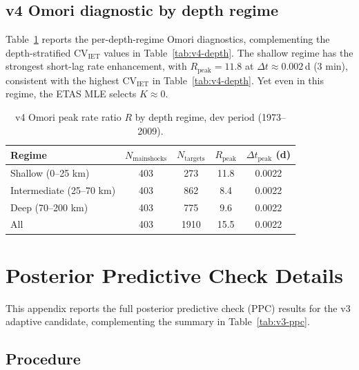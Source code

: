 \documentclass[10pt,a4paper,twocolumn]{article}
\begin{document}
\subsection{v4 Omori diagnostic by depth regime}

Table~\ref{tab:v4-omori-depth} reports the per-depth-regime Omori diagnostics, complementing the depth-stratified CV$_{\text{IET}}$ values in Table~\ref{tab:v4-depth}. The shallow regime has the strongest short-lag rate enhancement, with $R_{\text{peak}} = 11.8$ at $\Delta t \approx 0.002$\,d (3 min), consistent with the highest CV$_{\text{IET}}$ in Table~\ref{tab:v4-depth}. Yet even in this regime, the ETAS MLE selects $K\approx0$.

\begin{table}[t]
\centering
\caption{v4 Omori peak rate ratio $R$ by depth regime, dev period (1973--2009).}\label{tab:v4-omori-depth}
\small
\begin{tabular*}{\columnwidth}{@{\extracolsep{\fill}}lcccc}
\toprule
Regime & $N_{\text{mainshocks}}$ & $N_{\text{targets}}$ & $R_{\text{peak}}$ & $\Delta t_{\text{peak}}$ (d) \\
\midrule
Shallow (0--25 km)       & 403 & 273 & 11.8 & 0.0022 \\
Intermediate (25--70 km) & 403 & 862 & 8.4  & 0.0022 \\
Deep (70--200 km)        & 403 & 775 & 9.6  & 0.0022 \\
All                      & 403 & 1910 & 15.5 & 0.0022 \\
\bottomrule
\end{tabular*}
\end{table}

\section{Posterior Predictive Check Details}\label{app:ppc}

This appendix reports the full posterior predictive check (PPC) results for the v3 adaptive candidate, complementing the summary in Table~\ref{tab:v3-ppc}.

\subsection{Procedure}
\end{document}
